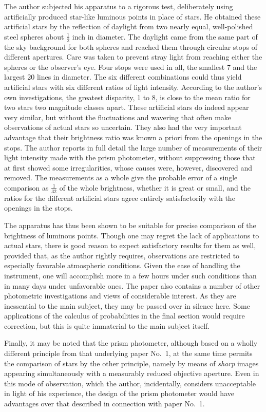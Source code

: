 The author subjected his apparatus to a rigorous test, deliberately using artificially produced star-like luminous points in place of stars. He obtained these artificial stars by the reflection of daylight from two nearly equal, well-polished steel spheres about $\frac{1}{2}$ inch in diameter. The daylight came from the same part of the sky background for both spheres and reached them through circular stops of different apertures. Care was taken to prevent stray light from reaching either the spheres or the observer's eye. Four stops were used in all, the smallest 7 and the largest 20 lines in diameter. The six different combinations could thus yield artificial stars with six different ratios of light intensity. According to the author's own investigations, the greatest disparity, 1 to 8, is close to the mean ratio for two stars two magnitude classes apart. These artificial stars do indeed appear very similar, but without the fluctuations and wavering that often make observations of actual stars so uncertain. They also had the very important advantage that their brightness ratio was known a priori from the openings in the stops. The author reports in full detail the large number of measurements of their light intensity made with the prism photometer, without suppressing those that at first showed some irregularities, whose causes were, however, discovered and removed. The measurements as a whole give the probable error of a single comparison as $\frac{1}{32}$ of the whole brightness, whether it is great or small, and the ratios for the different artificial stars agree entirely satisfactorily with the openings in the stops.

The apparatus has thus been shown to be suitable for precise comparison of the brightness of luminous points. Though one may regret the lack of applications to actual stars, there is good reason to expect satisfactory results for them as well, provided that, as the author rightly requires, observations are restricted to especially favorable atmospheric conditions. Given the ease of handling the instrument, one will accomplish more in a few hours under such conditions than in many days under unfavorable ones. The paper also contains a number of other photometric investigations and views of considerable interest. As they are inessential to the main subject, they may be passed over in silence here. Some applications of the calculus of probabilities in the final section would require correction, but this is quite immaterial to the main subject itself.

Finally, it may be noted that the prism photometer, although based on a wholly different
principle from that underlying paper No.~1, at the same time permits the comparison of stars by the other principle, namely by means of \emph{sharp} images appearing simultaneously with a measurably reduced objective aperture. Even in this mode of observation, which the author, incidentally, considers unacceptable in light of his experience, the design of the prism photometer would have advantages over that described in connection with paper No.~1.

